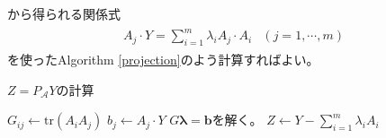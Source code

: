から得られる関係式
\begin{align*}
  \begin{array}{ll}
    A_j \cdot Y = \displaystyle{\sum_{i = 1}^m} \lambda_i A_j \cdot A_i & (j = 1, \cdots, m)
  \end{array}
\end{align*}
を使ったAlgorithm \ref{projection}のよう計算すればよい。
\begin{algorithm}
  \caption{$Z = P_\mathcal{A} Y$の計算}
  \label{projection}
  \begin{algorithmic}[1]
    \State $G_{i j} \leftarrow \mathrm{tr}(A_i A_j)$
    \State $b_j \leftarrow A_j \cdot Y$
    \State $G {\bm \lambda} = \mathbf{b}$を解く。
    \State \Return $Z \leftarrow Y - \displaystyle{\sum_{i = 1}^m \lambda_i A_i}$
  \end{algorithmic}
\end{algorithm}

